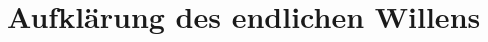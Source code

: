 \begin{comment}
Ich hatte oben einen ersten Einwand formuliert und gefragt, wie sich die
Thematisierung einer Bestimmung des Menschen zu dem Begriff der Freiheit
verhält, ob sie sich mit einem negativen Freiheitsbegriff verträgt oder einen
positiven Freiheitsbegriff zugrunde legt, und wie sich dies auf das Projekt
einer liberalen Aufklärung auswirkt.\footnote{Siehe S.
\pageref{Abschnitt:TwoConceptsofLiberty}.} Eine naheliegende Antwort lautet,
dass verbindliche Vorgaben, wie die je individuelle Freiheit auszufüllen sei,
ausschließlich der Moral entstammen. Wenn es einen Sinn gibt, in dem
\name[Immanuel]{Kant} einen \singlequote{positiven} Freiheitsbegriff verficht,
dann ist es danach genau der Sinn, den
\authorcite{Berlin:TheProperStudyofMankind1997} bereits ohne Erwähnung der
Anthropologie oder einer Bestimmung des Menschen der Moralphilosophie
\name[Immanuel]{Kant}s attestiert. Eine Anthropologie in pragmatischer Hinsicht
versucht nicht, die Freiheit des einzelnen mit weiteren Inhalten zu füllen und
den Begriff der Freiheit damit -- aus liberaler Sicht -- \emph{ad absurdum} zu
führen. Dennoch gibt es Maßstäbe der Vernunft, anhand derer wir unser Denken und
Handeln bewerten können.

\phantomsection\label{Abschnitt:DialektikderAufkaerungEinwaende}
Ein zweiter, dem ersten diametral entgegengesetzter Einwand gegen die Betonung
\singlequote{pragmatischer} Wissenschaften war: Damit reduziere Aufklärung unser Denken auf die bloße
Nützlichkeit und lasse kein vernünftiges Ziel mehr bestehen. Diesen Vorwurf
machen \authorcite{Horkheimer:DialektikderAufklaerung1997} im Ausgang von
\authorcite{Hegel:GesammelteWerke} stark.\footnote{Siehe
S.~\pageref{Abschnitt:AufklaerungunddieNuetzlichkeit}. Kürzlich wurde dieser
Einwand ausführlich von
\textcite[vgl.][passim]{Staedtler:KantunddieAporetikmodernerSubjektivitaet2011}
aufgegriffen.} Er ist die unmittelbare Kehrseite der Antwort auf den letzten
Einwand, denn er argumentiert, dass ein rein negativer Freiheitsbegriff den
einzelnen Menschen ohne Orientierung lasse und letztlich jede Bestimmung
vernünftiger Ziele jenseits der bloßen Selbsterhaltung unterminiere. Im nächsten
Abschnitt zeige ich auf, welche Erkenntnisse wir nach \name[Immanuel]{Kant}
benötigen, um unser Handeln an der Vernunft auszurichten.
\end{comment}

\section{Aufklärung des endlichen Willens}
